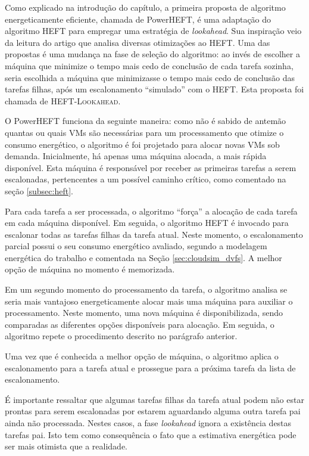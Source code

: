 Como explicado na introdução do capítulo, a primeira proposta de algoritmo
energeticamente eficiente, chamada de PowerHEFT, é uma adaptação do algoritmo
HEFT para empregar uma estratégia de \emph{lookahead}. Sua inspiração veio da
leitura do artigo \cite{bittencourt:heft_lookahead} que analisa diversas
otimizações ao HEFT. Uma das propostas é uma mudança na fase de seleção do
algoritmo: ao invés de escolher a máquina que minimize o tempo mais cedo de
conclusão de cada tarefa sozinha, seria escolhida a máquina que minimizasse o
tempo mais cedo de conclusão das tarefas filhas, após um escalonamento
``simulado'' com o HEFT. Esta proposta foi chamada de \textsc{HEFT-Lookahead}.

O PowerHEFT funciona da seguinte maneira: como não é sabido de antemão quantas
ou quais VMs são necessárias para um processamento que otimize o consumo
energético, o algoritmo é foi projetado para alocar novas VMs sob demanda.
Inicialmente, há apenas uma máquina alocada, a mais rápida disponível. Esta
máquina é responsável por receber as primeiras tarefas a serem escalonadas,
pertencentes a um possível caminho crítico, como comentado na seção
\ref{subsec:heft}.

Para cada tarefa a ser processada, o algoritmo ``força'' a alocação de cada
tarefa em cada máquina disponível. Em seguida, o algoritmo HEFT é invocado para
escalonar todas as tarefas filhas da tarefa atual. Neste momento, o
escalonamento parcial possui o seu consumo energético avaliado, segundo a
modelagem energética do trabalho \cite{guerout:energy_aware_simulation} e
comentada na Seção \ref{sec:cloudsim_dvfs}. A melhor opção de máquina no momento
é memorizada.

Em um segundo momento do processamento da tarefa, o algoritmo analisa se seria
mais vantajoso energeticamente alocar mais uma máquina para auxiliar o
processamento. Neste momento, uma nova máquina é disponibilizada, sendo
comparadas as diferentes opções disponíveis para alocação. Em seguida, o
algoritmo repete o procedimento descrito no parágrafo anterior.

Uma vez que é conhecida a melhor opção de máquina, o algoritmo aplica o
escalonamento para a tarefa atual e prossegue para a próxima tarefa da lista de
escalonamento.

É importante ressaltar que algumas tarefas filhas da tarefa atual podem não
estar prontas para serem escalonadas por estarem aguardando alguma outra
tarefa pai ainda não processada. Nestes casos, a fase \emph{lookahead} ignora
a existência destas tarefas pai. Isto tem como consequência o fato que a
estimativa energética pode ser mais otimista que a realidade.

